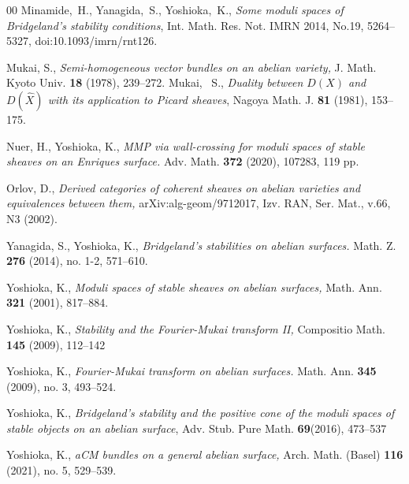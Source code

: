 \documentclass[10pt]{amsart}
\numberwithin{equation}{section}
\theoremstyle{plain}
\theoremstyle{definition}
\theoremstyle{remark}
\begin{document}
\begin{thebibliography}{00}
Minamide,~H., Yanagida,~S., Yoshioka,~K.,
\emph{Some moduli spaces of Bridgeland's stability conditions},
Int. Math. Res. Not. IMRN 2014, No.19, 5264--5327, 
doi:10.1093/imrn/rnt126.



Mukai, S.,
{\it Semi-homogeneous vector bundles on an abelian variety,}
J. Math. Kyoto Univ. {\bf 18} (1978), 239--272.
Mukai, ~S.,
\emph{Duality between $D(X)$ and $D(\widehat{X})$ 
with its application to Picard sheaves},
Nagoya Math. J. {\bf 81} (1981), 153--175. 


Nuer, H., Yoshioka, K., 
{\it MMP via wall-crossing for moduli spaces of stable sheaves on an Enriques surface.}
Adv. Math. {\bf 372} (2020), 107283, 119 pp. 


Orlov, D.,
{\it 
Derived categories of coherent sheaves on abelian varieties 
and equivalences between them,}
arXiv:alg-geom/9712017, Izv. RAN, Ser. Mat., v.66, N3 (2002).  









Yanagida, S., Yoshioka, K.,
{\it Bridgeland's stabilities on abelian surfaces.}
Math. Z. {\bf 276} (2014), no. 1-2, 571--610.

Yoshioka, K.,
{\it Moduli spaces of stable sheaves on abelian surfaces,}
Math. Ann. {\bf 321} (2001), 817--884.




Yoshioka, K.,
{\it Stability and the Fourier-Mukai transform II,}
Compositio Math. {\bf 145} (2009), 112--142 


Yoshioka, K.,
{\it Fourier-Mukai transform on abelian surfaces.}
Math. Ann. {\bf 345} (2009), no. 3, 493--524. 

Yoshioka, K.,
{\it Bridgeland's stability and the positive cone of the moduli spaces of stable objects on an abelian surface}, Adv. Stub. Pure Math. {\bf 69}(2016), 473--537




Yoshioka, K., {\it aCM bundles on a general abelian surface,}
Arch. Math. (Basel) {\bf 116} (2021), no. 5, 529--539.




\end{thebibliography}
\end{document}
